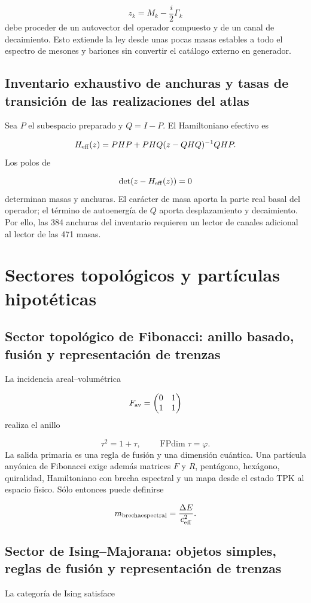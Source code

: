 \[
 z_k=M_k-\frac{i}{2}\Gamma_k
\]
debe proceder de un autovector del operador compuesto y de un canal de decaimiento. Esto extiende la ley desde unas pocas masas estables a todo el espectro de mesones y bariones sin convertir el catálogo externo en generador.

\subsection{Inventario exhaustivo de anchuras y tasas de transición de las realizaciones del atlas}
Sea \(P\) el subespacio preparado y \(Q=I-P\). El Hamiltoniano efectivo es

\[
 H_{\rm eff}(z)
 =PHP+PHQ(z-QHQ)^{-1}QHP.
\]
Los polos de

\[
 \det(z-H_{\rm eff}(z))=0
\]
determinan masas y anchuras. El carácter de masa aporta la parte real basal del operador; el término de autoenergía de \(Q\) aporta desplazamiento y decaimiento. Por ello, las 384 anchuras del inventario requieren un lector de canales adicional al lector de las 471 masas.

\section{Sectores topológicos y partículas hipotéticas}
\subsection{Sector topológico de Fibonacci: anillo basado, fusión y representación de trenzas}
La incidencia areal--volumétrica

\[
 F_{\rm av}=
 \begin{pmatrix}
 0&1\\1&1
 \end{pmatrix}
\]
realiza el anillo

\[
 \tau^2=1+\tau,\qquad
 \operatorname{FPdim}\tau=\varphi.
\]
La salida primaria es una regla de fusión y una dimensión cuántica. Una partícula anyónica de Fibonacci exige además matrices \(F\) y \(R\), pentágono, hexágono, quiralidad, Hamiltoniano con brecha espectral y un mapa desde el estado TPK al espacio físico. Sólo entonces puede definirse

\[
 m_{\rm brecha espectral}=\frac{\Delta E}{c_{\rm eff}^2}.
\]
\subsection{Sector de Ising–Majorana: objetos simples, reglas de fusión y representación de trenzas}
La categoría de Ising satisface

